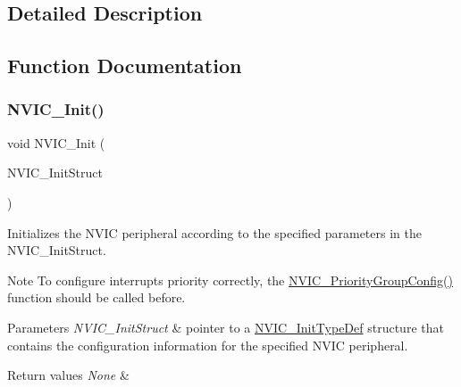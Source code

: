 \subsection{Detailed Description}


\subsection{Function Documentation}
\mbox{\label{group___m_i_s_c___private___functions_ga4ab373ed0870c06fca5eb51d639adf41}} 
\subsubsection{\texorpdfstring{N\+V\+I\+C\+\_\+\+Init()}{NVIC\_Init()}}
{\footnotesize\ttfamily void N\+V\+I\+C\+\_\+\+Init (\begin{DoxyParamCaption}\item[{\hyperlink{struct_n_v_i_c___init_type_def}{N\+V\+I\+C\+\_\+\+Init\+Type\+Def} $\ast$}]{N\+V\+I\+C\+\_\+\+Init\+Struct }\end{DoxyParamCaption})}



Initializes the N\+V\+IC peripheral according to the specified parameters in the N\+V\+I\+C\+\_\+\+Init\+Struct. 

\begin{DoxyNote}{Note}
To configure interrupts priority correctly, the \hyperlink{group___m_i_s_c___private___functions_gadfb1f34f803ce54c976643db8c484442}{N\+V\+I\+C\+\_\+\+Priority\+Group\+Config()} function should be called before. 
\end{DoxyNote}

\begin{DoxyParams}{Parameters}
{\em N\+V\+I\+C\+\_\+\+Init\+Struct} & pointer to a \hyperlink{struct_n_v_i_c___init_type_def}{N\+V\+I\+C\+\_\+\+Init\+Type\+Def} structure that contains the configuration information for the specified N\+V\+IC peripheral. \\
\hline
\end{DoxyParams}

\begin{DoxyRetVals}{Return values}
{\em None} & \\
\hline
\end{DoxyRetVals}


